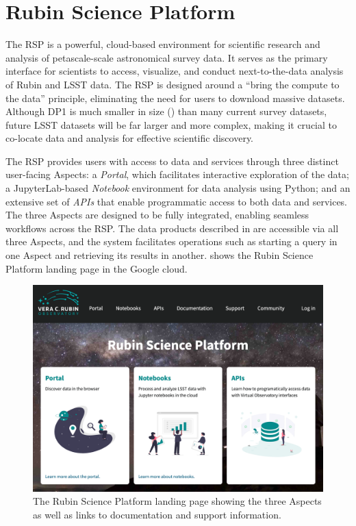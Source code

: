 \section{Rubin Science Platform}
\label{sec:data_services}

The \gls{RSP} \citep{LSE-319,DMTN-212} is a powerful, cloud-based environment for scientific research and analysis of petascale-scale astronomical survey data.
It serves as the primary interface for scientists to access, visualize, and conduct next-to-the-data analysis of Rubin and \gls{LSST} data.
The  \gls{RSP} is designed around a  ``bring the compute to the data'' principle, eliminating the need for users to download massive datasets.
Although \gls{DP1} is much smaller in size (\sizeinbytes) than many current survey datasets, future \gls{LSST} datasets will be far larger and more complex, making it crucial to co-locate data and analysis for effective scientific discovery.

The \gls{RSP} provides users with access to data and services through three distinct user-facing Aspects: a \emph{Portal}, which facilitates interactive exploration of the data; a JupyterLab-based \emph{Notebook} environment for data analysis using Python; and an extensive set of \emph{\glspl{API}} that enable programmatic access to both data and services.
The three Aspects are designed to be fully integrated, enabling seamless workflows across the \gls{RSP}.
The data products described in  are accessible via all three Aspects, and the system facilitates operations such as starting a query in one Aspect and retrieving its results in another.
 shows the Rubin \gls{Science Platform} landing page in the Google cloud.
\begin{figure}[htb!]
\centering
\includegraphics[width=0.98\linewidth]{rsp_landing_page}
\caption{The Rubin \gls{Science Platform} landing page showing the three Aspects as well as links to documentation and support information.}
\label{fig:rsp_landing_page}
\vspace{0.1cm}
\end{figure}

